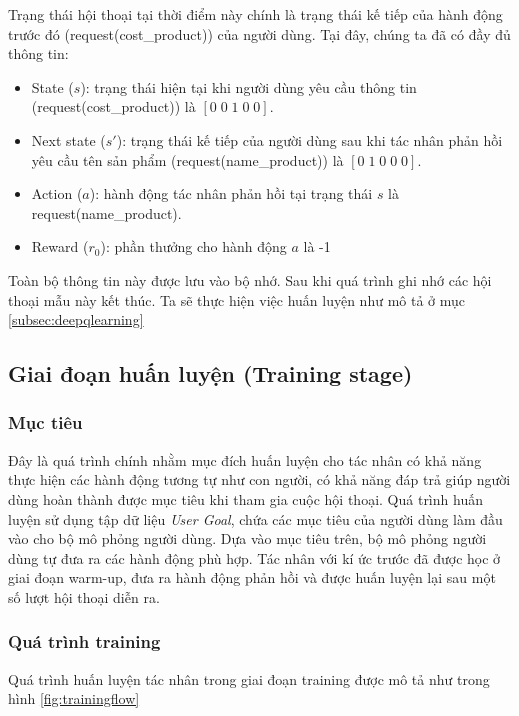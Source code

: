 Trạng thái hội thoại tại thời điểm này chính là trạng thái kế tiếp của hành động trước đó (request(cost\_product)) của người dùng.
Tại đây, chúng ta đã có đầy đủ thông tin:
\begin{itemize}
    \item State ($s$): trạng thái hiện tại khi người dùng yêu cầu thông tin (request(cost\_product)) là $[0\; 0\; 1\; 0\; 0]$.
    \item Next state ($s'$): trạng thái kế tiếp của người dùng sau khi tác nhân phản hồi yêu cầu tên sản phẩm (request(name\_product)) là $[0\; 1\; 0\; 0\; 0]$.
    \item Action ($a$): hành động tác nhân phản hồi tại trạng thái $s$ là request(name\_product).
    \item Reward ($r_0$): phần thưởng cho hành động $a$ là -1
\end{itemize}

Toàn bộ thông tin này được lưu vào bộ nhớ. Sau khi quá trình ghi nhớ các hội thoại mẫu này kết thúc. Ta sẽ thực hiện việc huấn luyện như mô tả ở mục \ref{subsec:deepqlearning}

\subsection{Giai đoạn huấn luyện (Training stage)}
\subsubsection{Mục tiêu}
Đây là quá trình chính nhằm mục đích huấn luyện cho tác nhân có khả năng thực hiện các hành động tương tự như con người, có khả năng đáp trả giúp người dùng hoàn thành được mục tiêu khi tham gia cuộc hội thoại. Quá trình huấn luyện sử dụng tập dữ liệu \textit{User Goal}, chứa các mục tiêu của người dùng làm đầu vào cho bộ mô phỏng người dùng. Dựa vào mục tiêu trên, bộ mô phỏng người dùng tự đưa ra các hành động phù hợp. Tác nhân với kí ức trước đã được học ở giai đoạn warm-up, đưa ra hành động phản hồi và được huấn luyện lại sau một số lượt hội thoại diễn ra.

\subsubsection{Quá trình training}
Quá trình huấn luyện tác nhân trong giai đoạn training được mô tả như trong hình \ref{fig:trainingflow}

